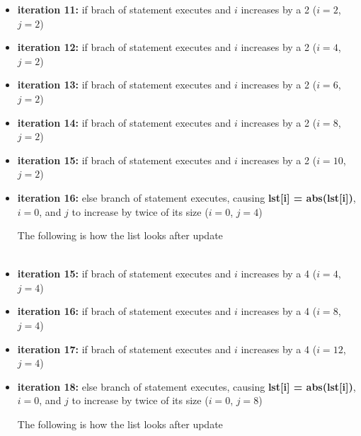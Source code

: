 \documentclass[12pt]{article}
\begin{document}
\begin{enumerate}[a.]
\begin{itemize}
\begin{itemize}
            \item \textbf{iteration 11:} if brach of statement executes and $i$ increases
            by a 2 ($i = 2$, $j = 2$)
            \item \textbf{iteration 12:} if brach of statement executes and $i$ increases
            by a 2 ($i = 4$, $j = 2$)
            \item \textbf{iteration 13:} if brach of statement executes and $i$ increases
            by a 2 ($i = 6$, $j = 2$)
            \item \textbf{iteration 14:} if brach of statement executes and $i$ increases
            by a 2 ($i = 8$, $j = 2$)
            \item \textbf{iteration 15:} if brach of statement executes and $i$ increases
            by a 2 ($i = 10$, $j = 2$)
            \item \textbf{iteration 16:} else branch of statement executes, causing
            \textbf{lst[i] = abs(lst[i])}, $i = 0$, and $j$ to increase by twice of its size ($i = 0$, $j = 4$)

            \bigskip

            The following is how the list looks after update

            \begin{align*}
                [0,0,0,0,0,0,0,0,1,1,-1,-1,-1,-1,-1,-1]
            \end{align*}

            \item \textbf{iteration 15:} if brach of statement executes and $i$ increases
            by a 4 ($i = 4$, $j = 4$)
            \item \textbf{iteration 16:} if brach of statement executes and $i$ increases
            by a 4 ($i = 8$, $j = 4$)
            \item \textbf{iteration 17:} if brach of statement executes and $i$ increases
            by a 4 ($i = 12$, $j = 4$)
            \item \textbf{iteration 18:} else branch of statement executes, causing
            \textbf{lst[i] = abs(lst[i])}, $i = 0$, and $j$ to increase by twice of its size ($i = 0$, $j = 8$)

            \bigskip

            The following is how the list looks after update

            \begin{align*}
                [0,0,0,0,0,0,0,0,1,1,-1,1,-1,-1,-1,-1]
            \end{align*}


\end{itemize}
\end{itemize}
\end{enumerate}
\end{document}
